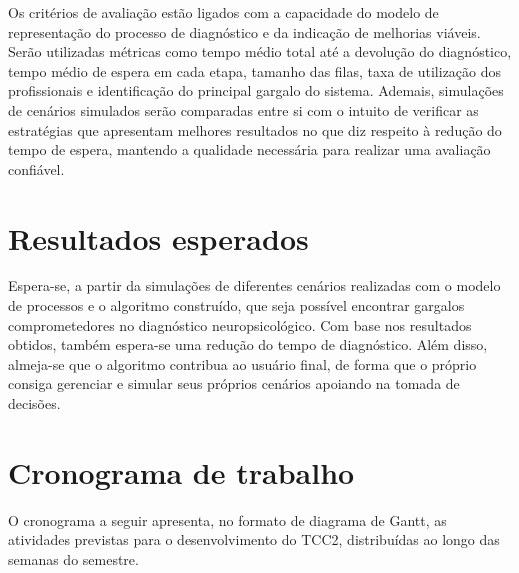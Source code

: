 \documentclass[
    12pt,                %
    openright,           %
    oneside,             %
    a4paper,             %
    english,             %
    brazil               %
]{abntex2}
\begin{document}
Os critérios de avaliação estão ligados com a capacidade do modelo de representação do processo de diagnóstico e da indicação de melhorias viáveis. Serão utilizadas métricas como tempo médio total até a devolução do diagnóstico, tempo médio de espera em cada etapa, tamanho das filas, taxa de utilização dos profissionais e identificação do principal gargalo do sistema. Ademais, simulações de cenários simulados serão comparadas entre si com o intuito de verificar as estratégias que apresentam melhores resultados no que diz respeito à redução do tempo de espera, mantendo a qualidade necessária para realizar uma avaliação confiável.

\section{Resultados esperados}
Espera-se, a partir da simulações de diferentes cenários realizadas com o modelo de processos e o algoritmo construído, que seja possível encontrar gargalos comprometedores no diagnóstico neuropsicológico. Com base nos resultados obtidos, também espera-se uma redução do tempo de diagnóstico. Além disso, almeja-se que o algoritmo contribua ao usuário final, de forma que o próprio consiga gerenciar e simular seus próprios cenários apoiando na tomada de decisões.


\section{Cronograma de trabalho}
\label{sec:cronograma}

O cronograma a seguir apresenta, no formato de diagrama de Gantt, as atividades previstas para o desenvolvimento do TCC2, distribuídas ao longo das semanas do semestre.
\end{document}
